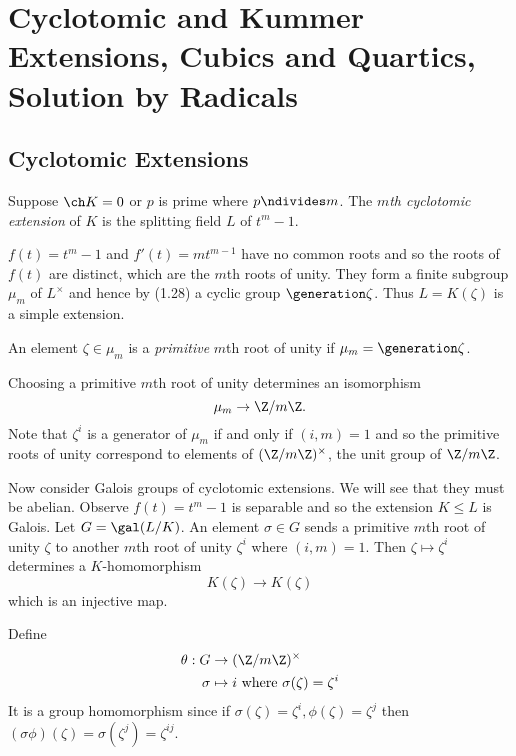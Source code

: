 \documentclass[a4paper]{article}
\begin{document}
\section{Cyclotomic and Kummer Extensions, Cubics and Quartics, Solution by Radicals}

\subsection{Cyclotomic Extensions}

\begin{definition}
  Suppose \(\ch K = 0\) or \(p\) is prime where \(p \ndivides m\). The \emph{\(m\)th cyclotomic extension} of \(K\) is the splitting field \(L\) of \(t^m - 1\).
\end{definition}

\begin{remark}
  \(f(t) = t^m - 1\) and \(f'(t) = mt^{m - 1}\) have no common roots and so the roots of \(f(t)\) are distinct, which are the \(m\)th roots of unity. They form a finite subgroup \(\mu_m\) of \(L^\times\) and hence by (1.28)  a cyclic group \(\generation \zeta\). Thus \(L = K(\zeta)\) is a simple extension.
\end{remark}

\begin{definition}
  An element \(\zeta \in \mu_m\) is a \emph{primitive} \(m\)th root of unity if \(\mu_m = \generation \zeta\).
\end{definition}

Choosing a primitive \(m\)th root of unity determines an isomorphism
\[
  \mu_m \to \Z/m\Z.
\]
Note that \(\zeta^i\) is a generator of \(\mu_m\) if and only if \((i, m) = 1\) and so the primitive roots of unity correspond to elements of \((\Z/m\Z)^\times\), the unit group of \(\Z/m\Z\).

Now consider Galois groups of cyclotomic extensions. We will see that they must be abelian. Observe \(f(t) = t^m - 1\) is separable and so the extension \(K \leq L\) is Galois. Let \(G = \gal(L/K)\). An element \(\sigma \in G\) sends a primitive \(m\)th root of unity \(\zeta\) to another \(m\)th root of unity \(\zeta^i\) where \((i, m) = 1\). Then \(\zeta \mapsto \zeta^i\) determines a \(K\)-homomorphism
\[
  K(\zeta) \to K(\zeta)
\]
which is an injective map.

\begin{definition}
  Define
  \begin{align*}
    \theta: G &\to (\Z/m\Z)^\times \\
    \sigma &\mapsto i \text{ where } \sigma(\zeta) = \zeta^i
  \end{align*}
  It is a group homomorphism since if \(\sigma(\zeta) = \zeta^i, \phi(\zeta) = \zeta^j\) then \((\sigma\phi)(\zeta) = \sigma(\zeta^j) = \zeta^{ij}\).
\end{definition}
\end{document}
